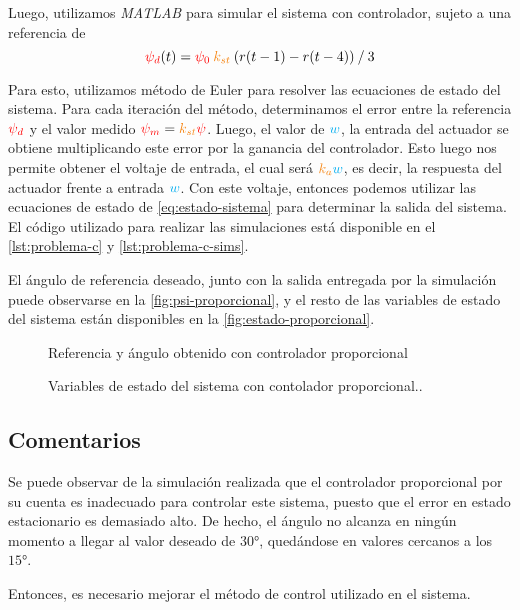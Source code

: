 Luego, utilizamos \textit{MATLAB} para simular el sistema con controlador, sujeto
a una referencia de
\begin{equation}
	\rojo{\psi_{d}}(t) = \rojo{\psi_{0}}\nara{k_{st}}\left(r(t-1) - r(t-4)\right) \mathbin{/} 3
\end{equation}

Para esto, utilizamos método de Euler para resolver las ecuaciones de estado
del sistema. Para cada iteración del método, determinamos el error entre la
referencia $\mathbin{\color{red}\psi_{d}}$ y el valor medido $\rojo{\psi_{m}} = \nara{k_{st}}\rojo{\psi}$.
Luego, el valor de $\mathbin{\color{cyan}w}$, la entrada del actuador se obtiene multiplicando
este error por la ganancia del controlador. Esto luego nos permite obtener el
voltaje de entrada, el cual será $\nara{k_{a}}\azul{w}$, es decir, la respuesta del
actuador frente a entrada $\mathbin{\color{cyan}w}$. Con este voltaje, entonces podemos utilizar
las ecuaciones de estado de \eqref{eq:estado-sistema} para determinar la salida del
sistema. El código utilizado para realizar las simulaciones está disponible en
el \autoref{lst:problema-c} y \autoref{lst:problema-c-sims}.

El ángulo de referencia deseado, junto con la salida entregada por la simulación
puede observarse en la \autoref{fig:psi-proporcional}, y el resto de las variables
de estado del sistema están disponibles en la \autoref{fig:estado-proporcional}.

\begin{figure}[h]
  \centering
  
  \caption{Referencia y ángulo obtenido con controlador proporcional}\label{fig:psi-proporcional}
\end{figure}

\begin{figure}[h]
  \centering
  
  \caption{Variables de estado del sistema con contolador proporcional..}\label{fig:estado-proporcional}
\end{figure}

\subsection{Comentarios}

Se puede observar de la simulación realizada que el controlador proporcional por
su cuenta es inadecuado para controlar este sistema, puesto que el error en estado
estacionario es demasiado alto. De hecho, el ángulo no alcanza en ningún momento
a llegar al valor deseado de $\ang{30}$, quedándose en valores cercanos a los $\ang{15}$.

Entonces, es necesario mejorar el método de control utilizado en el sistema.

